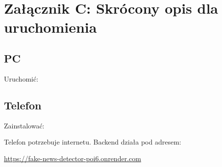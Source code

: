 \documentclass[12pt,a4paper]{article}
\begin{document}
\section{Załącznik C: Skrócony opis dla uruchomienia}
\subsection*{PC}
Uruchomić:
\begin{center}
\end{center}

\subsection*{Telefon}
Zainstalować:
\begin{center}
\end{center}
Telefon potrzebuje internetu.
Backend działa pod adresem:
\begin{center}
\url{https://fake-news-detector-poi6.onrender.com}
\end{center}
\end{document}
